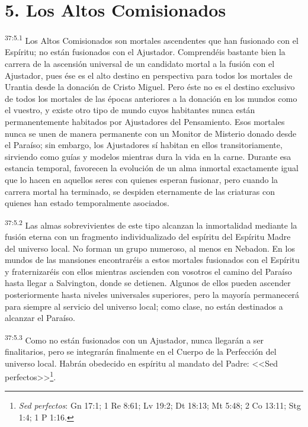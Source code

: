 \section*{5. Los Altos Comisionados}
\par
\textsuperscript{37:5.1} Los Altos Comisionados son mortales ascendentes que han fusionado con el Espíritu; no están fusionados con el Ajustador. Comprendéis bastante bien la carrera de la ascensión universal de un candidato mortal a la fusión con el Ajustador, pues ése es el alto destino en perspectiva para todos los mortales de Urantia desde la donación de Cristo Miguel. Pero éste no es el destino exclusivo de todos los mortales de las épocas anteriores a la donación en los mundos como el vuestro, y existe otro tipo de mundo cuyos habitantes nunca están permanentemente habitados por Ajustadores del Pensamiento. Esos mortales nunca se unen de manera permanente con un Monitor de Misterio donado desde el Paraíso; sin embargo, los Ajustadores sí habitan en ellos transitoriamente, sirviendo como guías y modelos mientras dura la vida en la carne. Durante esa estancia temporal, favorecen la evolución de un alma inmortal exactamente igual que lo hacen en aquellos seres con quienes esperan fusionar, pero cuando la carrera mortal ha terminado, se despiden eternamente de las criaturas con quienes han estado temporalmente asociados.

\par
\textsuperscript{37:5.2} Las almas sobrevivientes de este tipo alcanzan la inmortalidad mediante la fusión eterna con un fragmento individualizado del espíritu del Espíritu Madre del universo local. No forman un grupo numeroso, al menos en Nebadon. En los mundos de las mansiones encontraréis a estos mortales fusionados con el Espíritu y fraternizaréis con ellos mientras ascienden con vosotros el camino del Paraíso hasta llegar a Salvington, donde se detienen. Algunos de ellos pueden ascender posteriormente hasta niveles universales superiores, pero la mayoría permanecerá para siempre al servicio del universo local; como clase, no están destinados a alcanzar el Paraíso.

\par
\textsuperscript{37:5.3} Como no están fusionados con un Ajustador, nunca llegarán a ser finalitarios, pero se integrarán finalmente en el Cuerpo de la Perfección del universo local. Habrán obedecido en espíritu al mandato del Padre: <<Sed perfectos>>\footnote{\textit{Sed perfectos}: Gn 17:1; 1 Re 8:61; Lv 19:2; Dt 18:13; Mt 5:48; 2 Co 13:11; Stg 1:4; 1 P 1:16.}.


